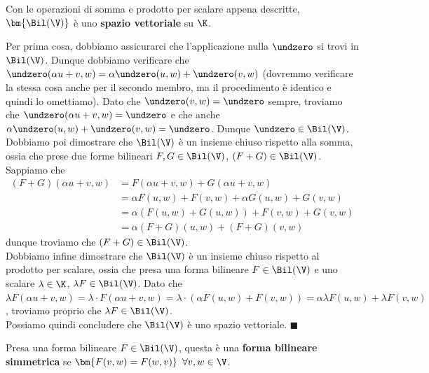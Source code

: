 \documentclass[11pt, a4paper, titlepage, oneside]{scrbook}
\begin{document}
\bigskip

\begin{Proposizione}[]
\label{propos-bil-spazio-vettoriale}
Con le operazioni di somma e prodotto per scalare appena descritte, $\bm{\Bil(\V)}$ è uno \textbf{spazio vettoriale} su $\K$.
\end{Proposizione}

\Dimostrazione \nopagebreak

Per prima cosa, dobbiamo assicurarci che l'applicazione nulla $\undzero$ si trovi in $\Bil(\V)$. Dunque dobbiamo verificare che $\undzero(\alpha u + v, w) = \alpha \undzero(u,w) + \undzero(v,w)$ (dovremmo verificare la stessa cosa anche per il secondo membro, ma il procedimento è identico e quindi lo omettiamo). Dato che $\undzero(v,w) = \undzero$ sempre, troviamo che $\undzero(\alpha u + v, w) = \undzero$ e che anche $\alpha \undzero(u,w) + \undzero(v,w) = \undzero$. Dunque $\undzero \in \Bil(\V)$. \\
Dobbiamo poi dimostrare che $\Bil(\V)$ è un insieme chiuso rispetto alla somma, ossia che prese due forme bilineari $F,G \in \Bil(\V)$, $(F+G) \in \Bil(\V)$. Sappiamo che
\begin{align*}
(F+G)(\alpha u + v, w) &= F(\alpha u + v, w) + G(\alpha u + v, w) \\
 &= \alpha F(u, w) + F(v,w) + \alpha G(u,w) + G(v,w) \\
 &= \alpha(F(u,w) + G(u,w)) + F(v,w) + G(v,w) \\
 &= \alpha (F+G)(u,w) + (F+G)(v,w)
\end{align*}
dunque troviamo che $(F+G) \in \Bil(\V)$. \\
Dobbiamo infine dimostrare che $\Bil(\V)$ è un insieme chiuso rispetto al prodotto per scalare, ossia che presa una forma bilineare $F \in \Bil(\V)$ e uno scalare $\lambda \in \K$, $\lambda F \in \Bil(\V)$. Dato che \mbox{$\lambda F(\alpha u + v, w) = \lambda \cdot F(\alpha u + v, w) = \lambda \cdot (\alpha F(u,w) + F(v,w)) = \alpha \lambda F(u,w) + \lambda F(v,w)$}, troviamo proprio che $\lambda F \in \Bil(\V)$. \\
Possiamo quindi concludere che $\Bil(\V)$ è uno spazio vettoriale. $\blacksquare$

\begin{Definizione}
\label{def-forma-bilineare-simmetrica}
Presa una forma bilineare $F \in \Bil(\V)$, questa è una \textbf{forma bilineare simmetrica} se $\bm{F(v,w) = F(w,v)} \enspace \forall v,w \in \V$.
\end{Definizione}
\end{document}
